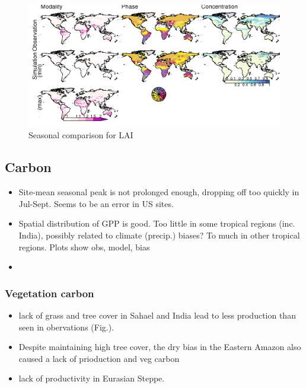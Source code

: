 \begin{figure}[t]
    \includegraphics[width=12cm]{figs/LAI/fire_var_seasonality-maps-MPCcontrol-lai.png}
    \caption{Seasonal comparison for LAI \label{fig:LAIseasonalMap}}
\end{figure}

\subsection{Carbon}

\begin{itemize}
    \item Site-mean seasonal peak is not prolonged enough, dropping off too quickly in Jul-Sept. Seems to be an error in US sites.
    \item Spatial distribution of GPP is good. Too little in some tropical regions (inc. India), possibly related to climate (precip.) biases? To much in other tropical regions. Plots show obs, model, bias
    \item {}
\end{itemize}

\subsubsection{Vegetation carbon}

\begin{itemize}
    \item lack of grass and tree cover in Sahael and India lead to less production than seen in obervations (Fig.). 
    \item Despite maintaining high tree cover, the dry bias in the Eastern Amazon also caused a lack of prioduction and veg carbon
    \item lack of productivity in Eurasian Steppe.
\end{itemize}

